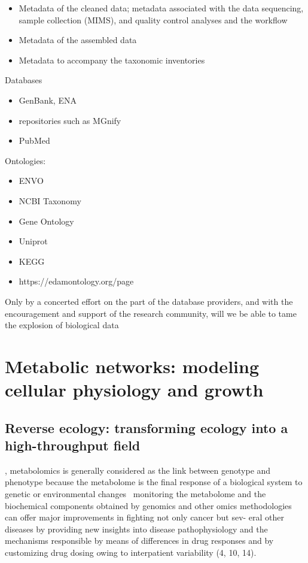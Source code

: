    


      \begin{itemize}
         \item Metadata of the cleaned data; metadata associated with the data sequencing, sample collection (MIMS), and quality control analyses and the workflow
         \item Metadata of the assembled data
         \item Metadata to accompany the taxonomic inventories

      \end{itemize}  


      Databases

      \begin{itemize}
         \item GenBank, ENA
         \item repositories such as MGnify 
         \item PubMed
      \end{itemize}


      Ontologies: 

      \begin{itemize}
         \item ENVO
         \item NCBI Taxonomy 
         \item Gene Ontology 
         \item Uniprot
         \item KEGG
         \item https://edamontology.org/page
      \end{itemize}
      \fi

      Only by a concerted effort on the part of the database providers, and with the encouragement and support of the research community, will we be able to tame the explosion of biological data



\section{Metabolic networks: modeling  cellular physiology and growth}


   \subsection{Reverse ecology: transforming ecology into a high-throughput field}


   , metabolomics is
   generally considered as the link between genotype and phenotype because the metabolome is the
   final response of a biological system to genetic or environmental changes~\cite{lima2021role}
   monitoring the metabolome and the biochemical components obtained by genomics and
other omics methodologies can offer major improvements in fighting not only cancer but sev-
eral other diseases by providing new insights into disease pathophysiology and the mechanisms
responsible by means of differences in drug responses and by customizing drug dosing owing to
interpatient variability (4, 10, 14).




